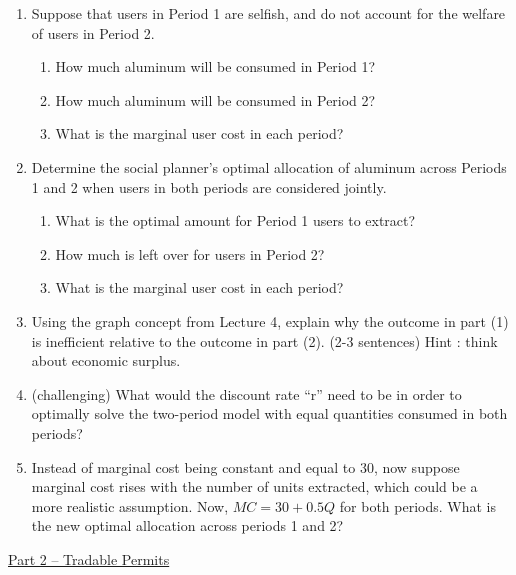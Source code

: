 \documentclass[11pt]{article}
\begin{document}
\begin{enumerate}
    \item Suppose that users in Period 1 are selfish, and do not account for the welfare of users in Period 2.
    \begin{enumerate} 
        \item How much aluminum will be consumed in Period 1?
        
        \item How much aluminum will be consumed in Period 2?
        
        \item What is the marginal user cost in each period?
    \end{enumerate}
    
    \item Determine the social planner’s optimal allocation of aluminum across Periods 1 and 2 when users in both periods are considered jointly.
    \begin{enumerate}
        \item What is the optimal amount for Period 1 users to extract?
        
        \item How much is left over for users in Period 2?
        
        \item What is the marginal user cost in each period?
    \end{enumerate}
    
    \item Using the graph concept from Lecture 4, explain why the outcome in part (1) is inefficient relative to the outcome in part (2). (2-3 sentences) Hint : think about economic surplus.
    
    \item (challenging) What would the discount rate “r” need to be in order to optimally solve the two-period model with equal quantities consumed in both periods?
    
    \item Instead of marginal cost being constant and equal to 30, now suppose marginal cost rises with the number of units extracted, which could be a more realistic assumption. Now, $MC = 30 + 0.5Q$ for both periods. What is the new optimal allocation across periods 1 and 2?
\end{enumerate}




\newpage

\begin{center}
    \underline{Part 2 -- Tradable Permits}
\end{center}
\end{document}

